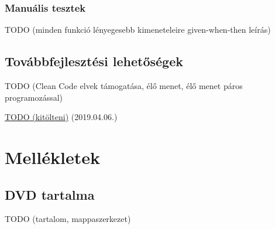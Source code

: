 \documentclass{elteikthesis}
\begin{document}
			\subsection{Manuális tesztek}
			TODO (minden funkció lényegesebb kimeneteleire given-when-then leírás)
		
		\section{Továbbfejlesztési lehetőségek}
		TODO (Clean Code elvek támogatása, élő menet, élő menet páros programozással)

	\begin{thebibliography}{99}


		\href{http://example.com}{TODO (kitölteni)} (2019.04.06.)

	\end{thebibliography}
	
	\chapter*{Mellékletek}


	\section*{DVD tartalma}
	TODO (tartalom, mappaszerkezet)
\end{document}
